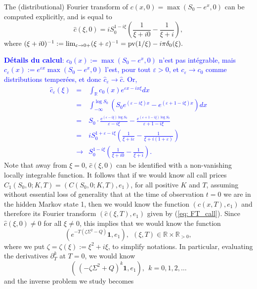 \documentclass[a4paper, 11pt]{amsart}
\newtheorem{definition and theorem}[theorem]{Definition and   
Theorem}
\begin{document}
The (distributional) Fourier transform of $c(x, 0 ) = \max (S_0 - e^x , 0 ) $ can be computed explicitly, and is equal to
\begin{equation}
    \widehat{c } (\xi , 0 ) = i S_0 ^{1 - i \xi } \left( \frac{1 }{\xi + i 0 } - \frac{1 }{\xi + i } \right) ,
\end{equation}
where $(\xi + i 0 )^{-1 } := \lim _{\varepsilon \to 0+ } (\xi + \varepsilon )^{-1 }  = {\rm pv } (1 / \xi ) - i \pi \delta _0 (\xi ) . $
\medskip

\noindent \textcolor{blue}{{\bf D\'etails du calcul}: $c_0 (x) := \max (S_0 - e^x , 0 ) $ n'est pas int\'egrable, mais $c_{\varepsilon } (x) := e^{\varepsilon x } \max (S_0 - e^x , 0 ) $ l'est, pour tout $\varepsilon > 0 $, et $c_{\varepsilon } \to c_0 $ comme distributions temper\'ees, et donc $\widehat{c }_{\varepsilon } \to \widehat{c } . $ Or,
    \begin{eqnarray*}
        \widehat{c }_{\varepsilon } (\xi ) &=& \int _{\mathbb{R } } c_0 (x) e^{\varepsilon x - i x \xi } dx \\
        &=& \int _{- \infty } ^{\log S_0 } \left( S_0 e^{(\varepsilon - i \xi ) x } - e^{(\varepsilon + 1 - i \xi ) x } \right) dx \\
        &=& S_0 \cdot \frac{e^{(\varepsilon - i \xi ) \log S_0 } }{\varepsilon - i \xi } - \frac{e^{(\varepsilon + 1 - i \xi ) \log S_0 } }{\varepsilon + 1 - i \xi } \\
        &=& i S_0 ^{1 + \varepsilon - i \xi } \left( \frac{1 }{\xi + i \varepsilon } - \frac{1 }{\xi + i (1 + \varepsilon ) } \right) \\
        &\to & S_0 ^{1 - i \xi } \left( \frac{1 }{\xi + i 0 } - \frac{1 }{\xi + i } \right) .
    \end{eqnarray*}
}
Note that away from $\xi = 0 $, $\widehat{c } (\xi , 0 ) $ can be identified with a non-vanishing locally integrable function. It follows that if we would know all call prices $C_1 (S_0 , 0 ; K , T ) = (C(S_0 , 0 ; K, T ) , e_1 ) $, for all positive $K $ and $T $, assuming without essential loss of generality that at the time of observation $t = 0 $ we are in the hidden Markov state 1, then we would know the function $(c(x, T ) , e_1 ) $ and therefore its Fourier transform $(\widehat{c } (\xi , T ) , e_1 ) $ given by (\ref{eq: FT_call}). Since $\widehat{c } (\xi , 0 ) \neq 0 $ for all $\xi \neq 0 $, this implies that we would know the function
\begin{equation}
    \left( e^{ - T (\zeta \Sigma ^2 - Q ) } \mathbf{1 } , e_1 \right) ,   \ \ (\xi , T ) \in \mathbb{R } \times \mathbb{R }_{> 0 } ,
\end{equation}
where we put $\zeta = \zeta (\xi ) := \xi ^2 + i \xi $, to simplify notations. In particular, evaluating the derivatives $\partial _T ^k $ at $T = 0 $, we would know
\begin{equation} \label{eq:donn�es_Pb_Inv}
    \left( \, ( - \zeta \Sigma ^2 + Q ) ^k \mathbf{1 } , e_1 \right) , \ \ k = 0, 1, 2, \ldots
\end{equation}
and the inverse problem we study becomes
\end{document}
